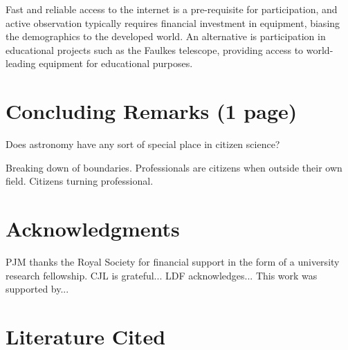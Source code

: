 \documentclass{ar2e}
\begin{document}
Fast and reliable access  to the internet is
a pre-requisite for participation, and active  observation typically requires
financial investment in equipment,  biasing the demographics to the developed
world.  An alternative is  participation in educational projects such as the
Faulkes telescope,  providing access to world-leading equipment for
educational purposes.


\section{Concluding Remarks (1 page)}
\label{sec:conclusions}

Does astronomy have any sort of special place in citizen science?

Breaking down of boundaries. Professionals are citizens when outside their own
field. Citizens turning professional.


\section*{Acknowledgments}


PJM thanks the Royal Society for financial support in the form of a university
research fellowship. 
%
CJL is grateful...
%
LDF acknowledges...
% 
This work was supported by...


\section{Literature Cited}





\end{document}

